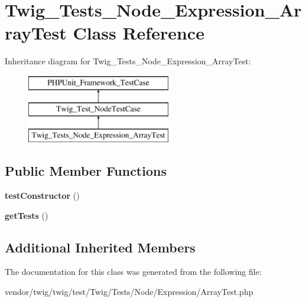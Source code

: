 \hypertarget{classTwig__Tests__Node__Expression__ArrayTest}{}\section{Twig\+\_\+\+Tests\+\_\+\+Node\+\_\+\+Expression\+\_\+\+Array\+Test Class Reference}
\label{classTwig__Tests__Node__Expression__ArrayTest}
Inheritance diagram for Twig\+\_\+\+Tests\+\_\+\+Node\+\_\+\+Expression\+\_\+\+Array\+Test\+:\begin{figure}[H]
\begin{center}
\leavevmode
\includegraphics[height=3.000000cm]{classTwig__Tests__Node__Expression__ArrayTest}
\end{center}
\end{figure}
\subsection*{Public Member Functions}
\begin{DoxyCompactItemize}
\item 
{\bfseries test\+Constructor} ()\hypertarget{classTwig__Tests__Node__Expression__ArrayTest_a90537e83053e7cd948a5bd77c89b2ccf}{}\label{classTwig__Tests__Node__Expression__ArrayTest_a90537e83053e7cd948a5bd77c89b2ccf}

\item 
{\bfseries get\+Tests} ()\hypertarget{classTwig__Tests__Node__Expression__ArrayTest_ad5a01865a6d0d432949c0426a854c982}{}\label{classTwig__Tests__Node__Expression__ArrayTest_ad5a01865a6d0d432949c0426a854c982}

\end{DoxyCompactItemize}
\subsection*{Additional Inherited Members}


The documentation for this class was generated from the following file\+:\begin{DoxyCompactItemize}
\item 
vendor/twig/twig/test/\+Twig/\+Tests/\+Node/\+Expression/Array\+Test.\+php\end{DoxyCompactItemize}
